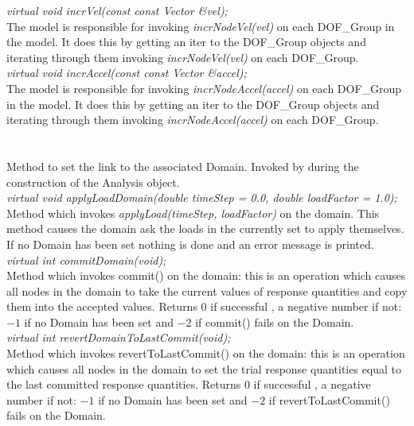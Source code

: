 {\em virtual void incrVel(const const Vector \&vel);} \\
The model is responsible for invoking {\em incrNodeVel(vel)} on each
DOF\_Group in the model. It does this by getting an iter to the
DOF\_Group objects and iterating through them invoking {\em
incrNodeVel(vel)} on each DOF\_Group. \\


{\em virtual void incrAccel(const const Vector \&accel);} \\
The model is responsible for invoking {\em incrNodeAccel(accel)} on each
DOF\_Group in the model. It does this by getting an iter to the
DOF\_Group objects and iterating through them invoking {\em
incrNodeAccel(accel)} on each DOF\_Group. \\



  \\
 \\
Method to set the link to the associated Domain. Invoked by
during the construction of the \p Analysis object.\\

{\em virtual void applyLoadDomain(double timeStep = 0.0, double
loadFactor = 1.0);}\\
Method which invokes {\em applyLoad(timeStep, loadFactor)} on the
domain. This method causes the domain ask the loads in the currently
set to apply themselves. If no Domain has been set nothing is done and an error
message is printed. \\ 


{\em virtual int commitDomain(void);} \\
Method which invokes commit() on the domain: this is an
operation which causes all nodes in the domain to take the current
values of response quantities and copy them into the accepted values. 
Returns $0$ if successful , a negative number if not: $-1$ if no
Domain has been set and $-2$ if commit() fails on the Domain.\\

{\em virtual int revertDomainToLastCommit(void);} \\
Method which invokes revertToLastCommit() on the domain: this is an
operation which causes all nodes in the domain to set the trial
response quantities equal to the last committed response quantities.
Returns $0$ if successful , a negative number if not: $-1$ if no
Domain has been set and $-2$ if \p revertToLastCommit() fails on
the Domain.\\ 

